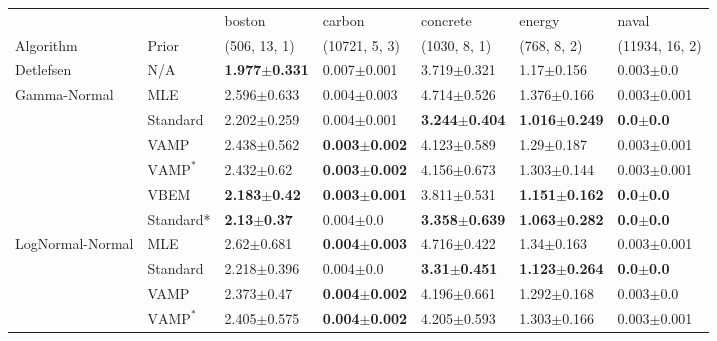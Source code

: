 \begin{tabular}{lllllll}
\toprule
                 &      &                    boston &                    carbon &                  concrete &                    energy &                 naval \\
Algorithm & Prior& (506, 13, 1)& (10721, 5, 3)& (1030, 8, 1)& (768, 8, 2)& (11934, 16, 2)\\
\midrule
Detlefsen & N/A &  \textbf{1.977$\pm$0.331} &           0.007$\pm$0.001 &           3.719$\pm$0.321 &            1.17$\pm$0.156 &         0.003$\pm$0.0 \\
Gamma-Normal & MLE &           2.596$\pm$0.633 &           0.004$\pm$0.003 &           4.714$\pm$0.526 &           1.376$\pm$0.166 &       0.003$\pm$0.001 \\
                 & Standard &           2.202$\pm$0.259 &           0.004$\pm$0.001 &  \textbf{3.244$\pm$0.404} &  \textbf{1.016$\pm$0.249} &  \textbf{0.0$\pm$0.0} \\
                 & VAMP &           2.438$\pm$0.562 &  \textbf{0.003$\pm$0.002} &           4.123$\pm$0.589 &            1.29$\pm$0.187 &       0.003$\pm$0.001 \\
                 & $\text{VAMP}^*$ &            2.432$\pm$0.62 &  \textbf{0.003$\pm$0.002} &           4.156$\pm$0.673 &           1.303$\pm$0.144 &       0.003$\pm$0.001 \\
                 & VBEM &   \textbf{2.183$\pm$0.42} &  \textbf{0.003$\pm$0.001} &           3.811$\pm$0.531 &  \textbf{1.151$\pm$0.162} &  \textbf{0.0$\pm$0.0} \\
                 & Standard* &    \textbf{2.13$\pm$0.37} &             0.004$\pm$0.0 &  \textbf{3.358$\pm$0.639} &  \textbf{1.063$\pm$0.282} &  \textbf{0.0$\pm$0.0} \\
LogNormal-Normal & MLE &            2.62$\pm$0.681 &  \textbf{0.004$\pm$0.003} &           4.716$\pm$0.422 &            1.34$\pm$0.163 &       0.003$\pm$0.001 \\
                 & Standard &           2.218$\pm$0.396 &             0.004$\pm$0.0 &   \textbf{3.31$\pm$0.451} &  \textbf{1.123$\pm$0.264} &  \textbf{0.0$\pm$0.0} \\
                 & VAMP &            2.373$\pm$0.47 &  \textbf{0.004$\pm$0.002} &           4.196$\pm$0.661 &           1.292$\pm$0.168 &         0.003$\pm$0.0 \\
                 & $\text{VAMP}^*$ &           2.405$\pm$0.575 &  \textbf{0.004$\pm$0.002} &           4.205$\pm$0.593 &           1.303$\pm$0.166 &       0.003$\pm$0.001 \\

\end{tabular}
